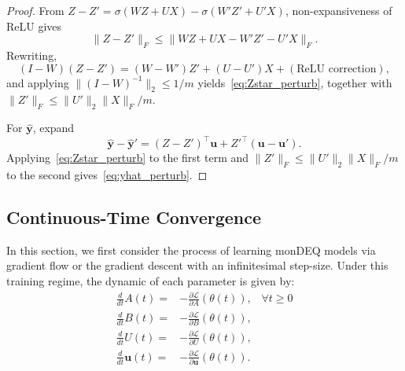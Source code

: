 \documentclass[twoside]{article}
\newcommand{\yhat}{\hat{\mathbf{y}}}
\newcommand{\ub}{\mathbf{u}}
\begin{document}
\begin{proof}
From $Z - Z' = \sigma(WZ+UX) - \sigma(W'Z'+U'X)$, non-expansiveness of ReLU gives
\[
\|Z-Z'\|_F \leq \|WZ + UX - W'Z' - U'X\|_F.
\]
Rewriting,
\[
(I-W)(Z-Z') = (W-W')Z' + (U-U')X + (\text{ReLU correction}),
\]
and applying $\|(I-W)^{-1}\|_2 \leq 1/m$ yields~\eqref{eq:Zstar_perturb}, together with
$\|Z'\|_F \leq \|U'\|_2\|X\|_F/m$.

For $\yhat$, expand
\[
\yhat-\yhat' = (Z-Z')^\top\ub + Z'^\top(\ub-\ub').
\]
Applying~\eqref{eq:Zstar_perturb} to the first term and
$\|Z'\|_F \leq \|U'\|_2\|X\|_F/m$ to the second gives~\eqref{eq:yhat_perturb}.
\end{proof}

\subsection{Continuous-Time Convergence}
In this section, we first consider the process of learning monDEQ models via gradient flow or the gradient descent with an infinitesimal step-size. Under this training regime, the dynamic of each parameter is given by:
\begin{align*}
    \frac{d}{dt} A(t) =& -\frac{\partial \mathcal{L}}{\partial A}(\theta(t)),\;\;\;\forall t \ge 0\\
    \frac{d}{dt} B(t) =& -\frac{\partial \mathcal{L}}{\partial B}(\theta(t)), \\
    \frac{d}{dt} U(t) =& -\frac{\partial \mathcal{L}}{\partial U}(\theta(t)), \\
    \frac{d}{dt} \mathbf{u}(t) =& -\frac{\partial \mathcal{L}}{\partial \mathbf{u}}(\theta(t)). \\
\end{align*}



\end{document}
